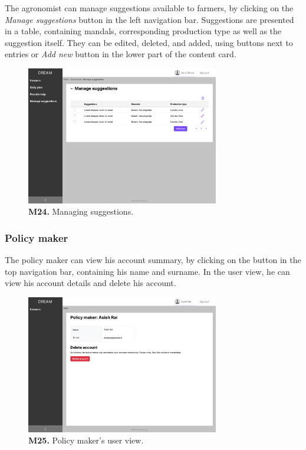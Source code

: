     The agronomist can manage suggestions available to farmers, by clicking on the \textit{Manage suggestions} button in the left navigation bar. Suggestions are presented in a table, containing mandals, corresponding production type as well as the suggestion itself. They can be edited, deleted, and added, using buttons next to entries or \textit{Add new} button in the lower part of the content card.
    \begin{figure}[H]
        \centering
        \includegraphics[width=0.75\textwidth]{mockups/Agronomist_Dashboard_Manage suggestions.png}
        \caption{\textbf{M24.} Managing suggestions.}
    \end{figure}
    
    \subsubsection{Policy maker}
    
    The policy maker can view his account summary, by clicking on the button in the top navigation bar, containing his name and surname. In the user view, he can view his account details and delete his account.
    \begin{figure}[H]
        \centering
        \includegraphics[width=0.75\textwidth]{mockups/Policy maker_User.png}
        \caption{\textbf{M25.} Policy maker's user view.}
    \end{figure}
    
